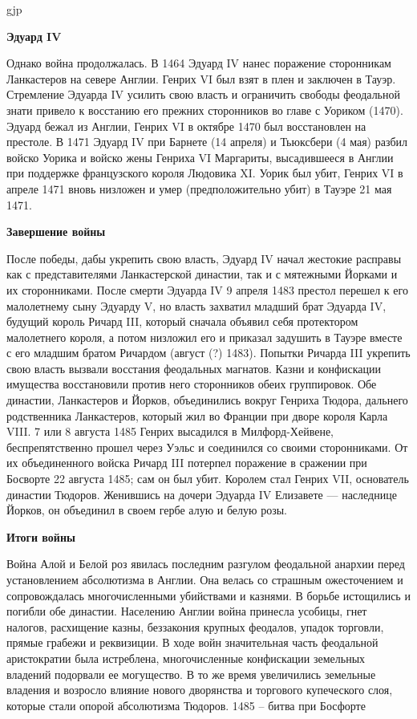 gjp	 \documentclass[12pt,a4paper]{article}
\begin{document}
\textbf{Эдуард IV}

Однако война продолжалась. В 1464 Эдуард IV нанес поражение сторонникам Ланкастеров на севере Англии. Генрих VI был взят в плен и заключен в Тауэр. Стремление Эдуарда IV усилить свою власть и ограничить свободы феодальной знати привело к восстанию его прежних сторонников во главе с Уориком (1470). Эдуард бежал из Англии, Генрих VI в октябре 1470 был восстановлен на престоле. В 1471 Эдуард IV при Барнете (14 апреля) и Тьюксбери (4 мая) разбил войско Уорика и войско жены Генриха VI Маргариты, высадившееся в Англии при поддержке французского короля Людовика XI. Уорик был убит, Генрих VI в апреле 1471 вновь низложен и умер (предположительно убит) в Тауэре 21 мая 1471.

\textbf{Завершение войны}

После победы, дабы укрепить свою власть, Эдуард IV начал жестокие расправы как с представителями Ланкастерской династии, так и с мятежными Йорками и их сторонниками. После смерти Эдуарда IV 9 апреля 1483 престол перешел к его малолетнему сыну Эдуарду V, но власть захватил младший брат Эдуарда IV, будущий король Ричард III, который сначала объявил себя протектором малолетнего короля, а потом низложил его и приказал задушить в Тауэре вместе с его младшим братом Ричардом (август (?) 1483). Попытки Ричарда III укрепить свою власть вызвали восстания феодальных магнатов. Казни и конфискации имущества восстановили против него сторонников обеих группировок. Обе династии, Ланкастеров и Йорков, объединились вокруг Генриха Тюдора, дальнего родственника Ланкастеров, который жил во Франции при дворе короля Карла VIII. 7 или 8 августа 1485 Генрих высадился в Милфорд-Хейвене, беспрепятственно прошел через Уэльс и соединился со своими сторонниками. От их объединенного войска Ричард III потерпел поражение в сражении при Босворте 22 августа 1485; сам он был убит. Королем стал Генрих VII, основатель династии Тюдоров. Женившись на дочери Эдуарда IV Елизавете — наследнице Йорков, он объединил в своем гербе алую и белую розы.

\textbf{Итоги войны}

Война Алой и Белой роз явилась последним разгулом феодальной анархии перед установлением абсолютизма в Англии. Она велась со страшным ожесточением и сопровождалась многочисленными убийствами и казнями. В борьбе истощились и погибли обе династии. Населению Англии война принесла усобицы, гнет налогов, расхищение казны, беззакония крупных феодалов, упадок торговли, прямые грабежи и реквизиции. В ходе войн значительная часть феодальной аристократии была истреблена, многочисленные конфискации земельных владений подорвали ее могущество. В то же время увеличились земельные владения и возросло влияние нового дворянства и торгового купеческого слоя, которые стали опорой абсолютизма Тюдоров.
1485 -- битва при Босфорте
\end{document}
